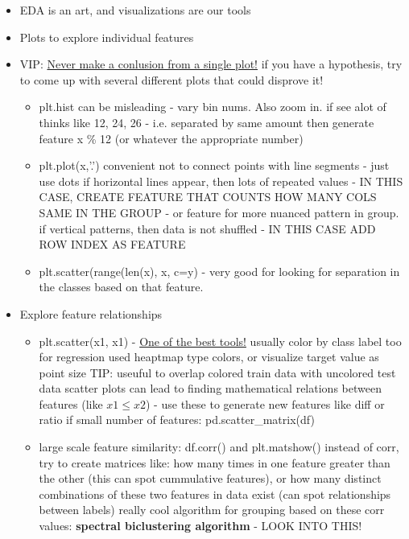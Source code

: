\documentclass[a4paper]{report}
\begin{document}
\begin{itemize}
  \item EDA is an art, and visualizations are our tools
  \item Plots to explore individual features
  \item VIP: \underline{Never make a conlusion from a single plot!} if you have a hypothesis, try to come up with several different plots that could disprove it!
    \begin{itemize}
      \item {\color{brown} plt.hist}
	\subitem can be misleading - vary bin nums. Also zoom in.
	\subitem if see alot of thinks like 12, 24, 26 - i.e. separated by same amount then generate feature x \% 12 (or whatever the appropriate number)
      \item {\color{brown} plt.plot(x,'.')}
	\subitem convenient not to connect points with line segments - just use dots
	\subitem if horizontal lines appear, then lots of repeated values - IN THIS CASE, CREATE FEATURE THAT COUNTS HOW MANY COLS SAME IN THE GROUP - or feature for more nuanced pattern in group.
	\subitem if vertical patterns, then data is not shuffled - IN THIS CASE ADD ROW INDEX AS FEATURE
      \item {\color{brown} plt.scatter(range(len(x), x, c=y)} - very good for looking for separation in the classes based on that feature.
    \end{itemize}
  \item Explore feature relationships
    \begin{itemize}
      \item {\color{brown} plt.scatter(x1, x1)} - \underline{One of the best tools!}
	\subitem usually color by class label too
	\subitem for regression used heaptmap type colors, or visualize target value as point size
  	\subitem TIP: useuful to overlap colored train data with uncolored test data 
	\subitem scatter plots can lead to finding mathematical relations between features (like $x1 \leq x2$) - use these to generate new features like diff or ratio
	\subitem if small number of features: {\color{brown} pd.scatter\_matrix(df)}
      \item large scale feature similarity: {\color{brown} df.corr()} and {\color{brown} plt.matshow()}
	\subitem instead of corr, try to create matrices like: how many times in one feature greater than the other (this can spot cummulative features), or how many distinct combinations of these two features in data exist (can spot relationships between labels)
	\subitem really  cool algorithm for grouping based on these corr values: {\bf spectral biclustering algorithm} - {\color{red}LOOK INTO THIS!}

\end{itemize}
\end{itemize}
\end{document}

